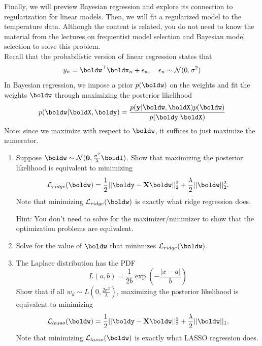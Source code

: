 \documentclass[submit]{../harvardml}
\begin{document}
\begin{problem}

Finally, we will preview Bayesian regression and explore its connection to regularization for linear models. Then, we will fit a regularized model to the temperature data. Although the content is related, you do not need to know the material from the lectures on frequentist model selection and Bayesian model selection to solve this problem.  \\

\noindent Recall that the probabilistic version of linear regression states that 
\[y_n = \boldw^\top\boldx_n + \epsilon_n, \quad \epsilon_n \sim \mathcal{N}(0, \sigma^2)\]
In Bayesian regression, we impose a prior $p(\boldw)$ on the weights and  fit the weights $\boldw$ through maximizing the posterior likelihood
\[p(\boldw | \boldX, \boldy) = \frac{p(\bold y | \boldw, \boldX)p(\boldw)}{p(\boldy | \boldX)}\]
Note: since we maximize with respect to $\boldw$, it suffices to just maximize the numerator.

\begin{enumerate}
    \item Suppose $\boldw \sim \mathcal{N}(\mathbf{0},\frac{\sigma^2}{\lambda}\boldI)$. Show that maximizing the posterior likelihood is equivalent to minimizing 
    \[\mathcal{L}_{ridge}(\boldw) = \frac{1}{2}||\boldy -\bold X\boldw||_2^2 + \frac{\lambda}{2}||\boldw||_2^2.\] 
    Note that minimizing $\mathcal{L}_{ridge}(\boldw)$ is exactly what ridge regression does.
    
    Hint: You don't need to solve for the maximizer/minimizer to show that the optimization problems are equivalent.
    
    \item Solve for the value of $\boldw$ that minimizes $\mathcal L_{ridge}(\boldw)$.

    \item The Laplace distribution has the PDF
   \[L(a,b) =\frac{1}{2b} \exp\left(-\frac{|x - a|}{b}\right)\]
Show that if all $w_d \sim L\left(0,\frac{2\sigma^2}{\lambda}\right)$, maximizing the posterior likelihood is equivalent to minimizing 
\[\mathcal{L}_{lasso}(\boldw) = \frac{1}{2}||\boldy -\bold X\boldw||_2^2  + \frac{\lambda}{2}||\boldw||_1.\] 
Note that minimizing $\mathcal{L}_{lasso}(\boldw)$ is exactly what LASSO regression does.


\end{enumerate}
\end{problem}
\end{document}
